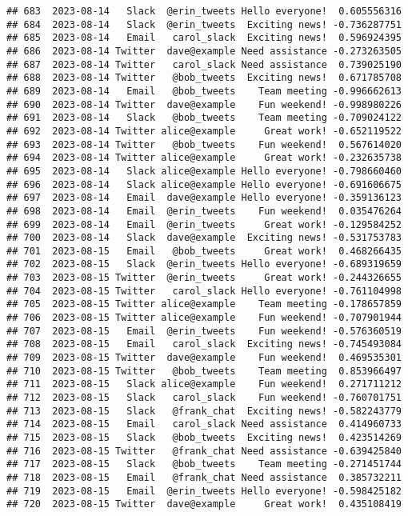 \documentclass[
]{article}
\begin{document}
\begin{verbatim}
## 683  2023-08-14   Slack  @erin_tweets Hello everyone!  0.605556316
## 684  2023-08-14   Slack  @erin_tweets  Exciting news! -0.736287751
## 685  2023-08-14   Email   carol_slack  Exciting news!  0.596924395
## 686  2023-08-14 Twitter  dave@example Need assistance -0.273263505
## 687  2023-08-14 Twitter   carol_slack Need assistance  0.739025190
## 688  2023-08-14 Twitter   @bob_tweets  Exciting news!  0.671785708
## 689  2023-08-14   Email   @bob_tweets    Team meeting -0.996662613
## 690  2023-08-14 Twitter  dave@example    Fun weekend! -0.998980226
## 691  2023-08-14   Slack   @bob_tweets    Team meeting -0.709024122
## 692  2023-08-14 Twitter alice@example     Great work! -0.652119522
## 693  2023-08-14 Twitter   @bob_tweets    Fun weekend!  0.567614020
## 694  2023-08-14 Twitter alice@example     Great work! -0.232635738
## 695  2023-08-14   Slack alice@example Hello everyone! -0.798660460
## 696  2023-08-14   Slack alice@example Hello everyone! -0.691606675
## 697  2023-08-14   Email  dave@example Hello everyone! -0.359136123
## 698  2023-08-14   Email  @erin_tweets    Fun weekend!  0.035476264
## 699  2023-08-14   Email  @erin_tweets     Great work! -0.129584252
## 700  2023-08-14   Slack  dave@example  Exciting news! -0.531753783
## 701  2023-08-15   Email   @bob_tweets     Great work!  0.468266435
## 702  2023-08-15   Slack  @erin_tweets Hello everyone! -0.689319659
## 703  2023-08-15 Twitter  @erin_tweets     Great work! -0.244326655
## 704  2023-08-15 Twitter   carol_slack Hello everyone! -0.761104998
## 705  2023-08-15 Twitter alice@example    Team meeting -0.178657859
## 706  2023-08-15 Twitter alice@example    Fun weekend! -0.707901944
## 707  2023-08-15   Email  @erin_tweets    Fun weekend! -0.576360519
## 708  2023-08-15   Email   carol_slack  Exciting news! -0.745493084
## 709  2023-08-15 Twitter  dave@example    Fun weekend!  0.469535301
## 710  2023-08-15 Twitter   @bob_tweets    Team meeting  0.853966497
## 711  2023-08-15   Slack alice@example    Fun weekend!  0.271711212
## 712  2023-08-15   Slack   carol_slack    Fun weekend! -0.760701751
## 713  2023-08-15   Slack   @frank_chat  Exciting news! -0.582243779
## 714  2023-08-15   Email   carol_slack Need assistance  0.414960733
## 715  2023-08-15   Slack   @bob_tweets  Exciting news!  0.423514269
## 716  2023-08-15 Twitter   @frank_chat Need assistance -0.639425840
## 717  2023-08-15   Slack   @bob_tweets    Team meeting -0.271451744
## 718  2023-08-15   Email   @frank_chat Need assistance  0.385732211
## 719  2023-08-15   Email  @erin_tweets Hello everyone! -0.598425182
## 720  2023-08-15 Twitter  dave@example     Great work!  0.435108419

\end{verbatim}
\end{document}
